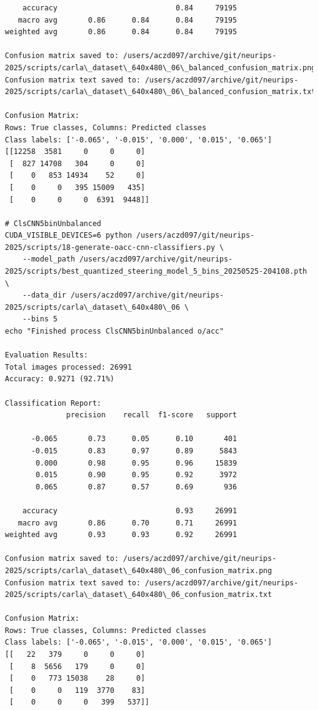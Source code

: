 \begin{verbatim}
    accuracy                           0.84     79195
   macro avg       0.86      0.84      0.84     79195
weighted avg       0.86      0.84      0.84     79195

Confusion matrix saved to: /users/aczd097/archive/git/neurips-2025/scripts/carla\_dataset\_640x480\_06\_balanced_confusion_matrix.png
Confusion matrix text saved to: /users/aczd097/archive/git/neurips-2025/scripts/carla\_dataset\_640x480\_06\_balanced_confusion_matrix.txt

Confusion Matrix:
Rows: True classes, Columns: Predicted classes
Class labels: ['-0.065', '-0.015', '0.000', '0.015', '0.065']
[[12258  3581     0     0     0]
 [  827 14708   304     0     0]
 [    0   853 14934    52     0]
 [    0     0   395 15009   435]
 [    0     0     0  6391  9448]]

# ClsCNN5binUnbalanced
CUDA_VISIBLE_DEVICES=6 python /users/aczd097/git/neurips-2025/scripts/18-generate-oacc-cnn-classifiers.py \
    --model_path /users/aczd097/archive/git/neurips-2025/scripts/best_quantized_steering_model_5_bins_20250525-204108.pth \
    --data_dir /users/aczd097/archive/git/neurips-2025/scripts/carla\_dataset\_640x480\_06 \
    --bins 5
echo "Finished process ClsCNN5binUnbalanced o/acc"

Evaluation Results:
Total images processed: 26991
Accuracy: 0.9271 (92.71%)

Classification Report:
              precision    recall  f1-score   support

      -0.065       0.73      0.05      0.10       401
      -0.015       0.83      0.97      0.89      5843
       0.000       0.98      0.95      0.96     15839
       0.015       0.90      0.95      0.92      3972
       0.065       0.87      0.57      0.69       936

    accuracy                           0.93     26991
   macro avg       0.86      0.70      0.71     26991
weighted avg       0.93      0.93      0.92     26991

Confusion matrix saved to: /users/aczd097/archive/git/neurips-2025/scripts/carla\_dataset\_640x480\_06_confusion_matrix.png
Confusion matrix text saved to: /users/aczd097/archive/git/neurips-2025/scripts/carla\_dataset\_640x480\_06_confusion_matrix.txt

Confusion Matrix:
Rows: True classes, Columns: Predicted classes
Class labels: ['-0.065', '-0.015', '0.000', '0.015', '0.065']
[[   22   379     0     0     0]
 [    8  5656   179     0     0]
 [    0   773 15038    28     0]
 [    0     0   119  3770    83]
 [    0     0     0   399   537]]


\end{verbatim}

